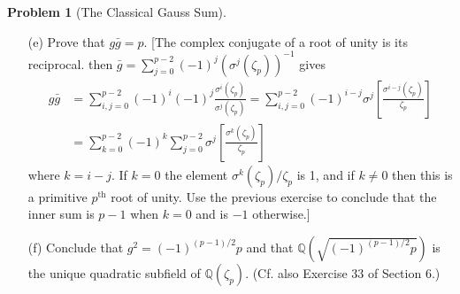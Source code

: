 \documentclass{article}
\theoremstyle{definition}
\newtheorem{prob}{Problem}
\newcommand{\QQ}{\mathbb Q}
\begin{document}
\begin{prob}[The Classical Gauss Sum]
\begin{enumerate}
		\item[(e)] Prove that $g \bar{g} = p$.
			[The complex conjugate of a root of unity is its reciprocal.
			then $\bar{g} = \sum_{j = 0}^{p - 2} (-1)^j (\sigma^j(\zeta_p))^{-1}$ gives
			\[
				\begin{split}
					g \bar{g} &= \sum_{i, j = 0}^{p - 2} (-1)^i (-1)^j \frac{\sigma^i (\zeta_p)}{\sigma^j (\zeta_p)} = \sum_{i, j = 0}^{p - 2} (-1)^{i - j} \sigma^j \left[ \frac{\sigma^{i - j}(\zeta_p)}{\zeta_p} \right]\\
					&= \sum_{k = 0}^{p - 2} (-1)^k \sum_{j = 0}^{p - 2} \sigma^j \left[ \frac{\sigma^k(\zeta_p)}{\zeta_p} \right]
				\end{split}
			\]
			where $k = i - j$.
			If $k = 0$ the element $\sigma^k(\zeta_p)/\zeta_p$ is 1, and if $k \neq 0$ then this is a primitive $p^{\text{th}}$ root of unity.
			Use the previous exercise to conclude that the inner sum is $p - 1$ when $k = 0$ and is $-1$ otherwise.]

		\item[(f)] Conclude that $g^2 = (-1)^{(p - 1)/2} p$ and that $\QQ(\sqrt{(-1)^{(p - 1)/2} p})$ is the unique quadratic subfield of $\QQ(\zeta_p)$. (Cf. also Exercise 33 of Section 6.)
	\end{enumerate}
\end{prob}
\end{document}
